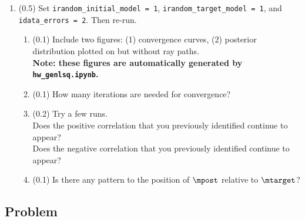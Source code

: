 \documentclass[11pt,titlepage,fleqn]{article}
\newcommand{\tfile}{{\tt hw\_genlsq.ipynb}}
\begin{document}
\begin{enumerate}

\item (0.5) Set \verb+irandom_initial_model = 1+, \verb+irandom_target_model = 1+, and \verb+idata_errors = 2+. Then re-run.
%
\begin{enumerate}
\item (0.1) Include two figures: (1) convergence curves, (2) posterior distribution plotted on  but without ray paths. \\
{\bf Note: these figures are automatically generated by \tfile.}
\item (0.1) How many iterations are needed for convergence?
\item (0.2) Try a few runs. \\
Does the positive correlation that you previously identified continue to appear? \\
Does the negative correlation that you previously identified continue to appear?
\item (0.1) Is there any pattern to the position of $\mpost$ relative to $\mtarget$?
\end{enumerate}

\end{enumerate}



\subsection*{Problem} \howmuchtime\




\clearpage\pagebreak


\end{document}
